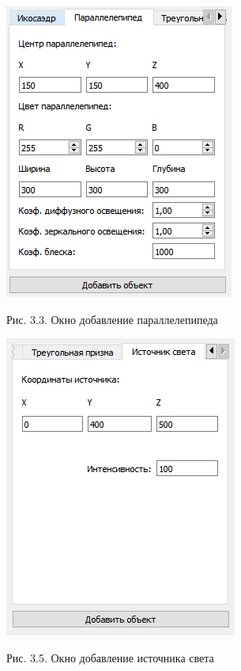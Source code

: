 \documentclass[12pt]{report}
\begin{document}
		\begin{minipage}{0.5\textwidth}
		\begin{center}
			\includegraphics[scale=0.8]{paral.png}
			
			Рис. 3.3. Окно добавление параллелепипеда
		\end{center}
	\end{minipage}
	\hfill
	\begin{minipage}{0.5\textwidth}
		\begin{center}
			\includegraphics[scale=0.8]{lt.png}
			
			Рис. 3.5. Окно добавление источника света
		\end{center}
	\end{minipage}
\end{document}
